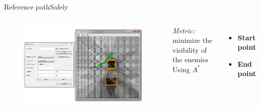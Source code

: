 \begin{frame}{Reference path}{Safely}

\begin{columns}
\begin{figure}
\centering
\includegraphics[width = \textwidth]{./screenshot/safely_reference_path.png}
\end{figure}

\begin{minipage}{\textwidth}
\emph{Metric:} minimize the visibility of the enemies
\bigskip
Using $ A^{*} $
\begin{itemize}
\item \textbf{Start point}
\item \textbf{End point}
\end{itemize}
\end{minipage}
\end{columns}

\end{frame}

